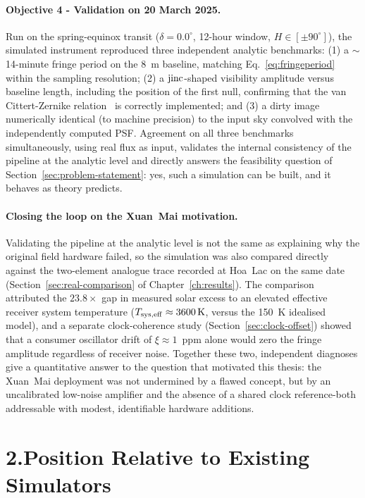 \paragraph{Objective 4 - Validation on 20 March 2025.}
Run on the spring-equinox transit ($\delta=0.0^\circ$, 12-hour window,
$H\in[\pm90^\circ]$), the simulated instrument reproduced three independent analytic
benchmarks: (1) a $\sim$14-minute fringe period on the \SI{8}{\metre} baseline,
matching Eq.~\eqref{eq:fringeperiod} within the sampling resolution; (2) a
$\operatorname{jinc}$-shaped visibility amplitude versus baseline length, including the position of
the first null, confirming that the van Cittert-Zernike relation~\citep{tms2017,taylor1999synthesis} is correctly
implemented; and (3) a dirty image numerically identical (to machine precision) to the
input sky convolved with the independently computed PSF. Agreement on all three
benchmarks simultaneously, using real flux as input, validates the internal
consistency of the pipeline at the analytic level and directly answers the
feasibility question of Section~\ref{sec:problem-statement}: yes, such a simulation
can be built, and it behaves as theory predicts.

\paragraph{Closing the loop on the Xuan~Mai motivation.}
Validating the pipeline at the analytic level is not the same as explaining why the
original field hardware failed, so the simulation was also compared directly against
the two-element analogue trace recorded at Hoa~Lac on the same date
(Section~\ref{sec:real-comparison} of Chapter~\ref{ch:results}). The comparison
attributed the $23.8\times$ gap in measured solar excess to an elevated effective
receiver system temperature ($T_{\rm sys,eff}\approx\SI{3\,600}{\kelvin}$, versus the
\SI{150}{\kelvin} idealised model), and a separate clock-coherence study
(Section~\ref{sec:clock-offset}) showed that a consumer oscillator drift of
$\xi\approx1$~ppm alone would zero the fringe amplitude regardless of receiver noise.
Together these two, independent diagnoses give a quantitative answer to the question
that motivated this thesis: the Xuan~Mai deployment was not undermined by a flawed
concept, but by an uncalibrated low-noise amplifier and the absence of a shared clock
reference-both addressable with modest, identifiable hardware additions.

\section*{2.\quad Position Relative to Existing Simulators}

